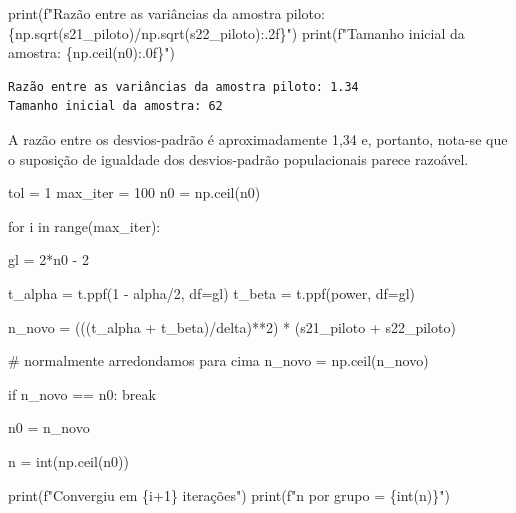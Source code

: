 \documentclass[
  letterpaper,
  DIV=11,
  numbers=noendperiod]{scrreprt}
\newenvironment{Shaded}{\begin{snugshade}}{\end{snugshade}}
\newcommand{\BuiltInTok}[1]{\textcolor[rgb]{0.00,0.23,0.31}{#1}}
\newcommand{\CommentTok}[1]{\textcolor[rgb]{0.37,0.37,0.37}{#1}}
\newcommand{\ControlFlowTok}[1]{\textcolor[rgb]{0.00,0.23,0.31}{#1}}
\newcommand{\DecValTok}[1]{\textcolor[rgb]{0.68,0.00,0.00}{#1}}
\newcommand{\KeywordTok}[1]{\textcolor[rgb]{0.00,0.23,0.31}{#1}}
\newcommand{\NormalTok}[1]{\textcolor[rgb]{0.00,0.23,0.31}{#1}}
\newcommand{\OperatorTok}[1]{\textcolor[rgb]{0.37,0.37,0.37}{#1}}
\newcommand{\SpecialCharTok}[1]{\textcolor[rgb]{0.37,0.37,0.37}{#1}}
\newcommand{\SpecialStringTok}[1]{\textcolor[rgb]{0.13,0.47,0.30}{#1}}
\begin{document}
\begin{Shaded}
\begin{Highlighting}[]
\BuiltInTok{print}\NormalTok{(}\SpecialStringTok{f"Razão entre as variâncias da amostra piloto: }\SpecialCharTok{\{}\NormalTok{np}\SpecialCharTok{.}\NormalTok{sqrt(s21\_piloto)}\OperatorTok{/}\NormalTok{np}\SpecialCharTok{.}\NormalTok{sqrt(s22\_piloto)}\SpecialCharTok{:.2f\}}\SpecialStringTok{"}\NormalTok{)}
\BuiltInTok{print}\NormalTok{(}\SpecialStringTok{f"Tamanho inicial da amostra: }\SpecialCharTok{\{}\NormalTok{np}\SpecialCharTok{.}\NormalTok{ceil(n0)}\SpecialCharTok{:.0f\}}\SpecialStringTok{"}\NormalTok{)}
\end{Highlighting}
\end{Shaded}

\begin{verbatim}
Razão entre as variâncias da amostra piloto: 1.34
Tamanho inicial da amostra: 62
\end{verbatim}

A razão entre os desvios-padrão é aproximadamente 1,34 e, portanto,
nota-se que o suposição de igualdade dos desvios-padrão populacionais
parece razoável.

\begin{Shaded}
\begin{Highlighting}[]
\NormalTok{tol }\OperatorTok{=} \DecValTok{1}
\NormalTok{max\_iter }\OperatorTok{=} \DecValTok{100}
\NormalTok{n0 }\OperatorTok{=}\NormalTok{ np.ceil(n0)}

\ControlFlowTok{for}\NormalTok{ i }\KeywordTok{in} \BuiltInTok{range}\NormalTok{(max\_iter):}

\NormalTok{    gl }\OperatorTok{=} \DecValTok{2}\OperatorTok{*}\NormalTok{n0 }\OperatorTok{{-}} \DecValTok{2}

\NormalTok{    t\_alpha }\OperatorTok{=}\NormalTok{ t.ppf(}\DecValTok{1} \OperatorTok{{-}}\NormalTok{ alpha}\OperatorTok{/}\DecValTok{2}\NormalTok{, df}\OperatorTok{=}\NormalTok{gl)}
\NormalTok{    t\_beta }\OperatorTok{=}\NormalTok{ t.ppf(power, df}\OperatorTok{=}\NormalTok{gl)}

\NormalTok{    n\_novo }\OperatorTok{=}\NormalTok{ (((t\_alpha }\OperatorTok{+}\NormalTok{ t\_beta)}\OperatorTok{/}\NormalTok{delta)}\OperatorTok{**}\DecValTok{2}\NormalTok{) }\OperatorTok{*}\NormalTok{ (s21\_piloto }\OperatorTok{+}\NormalTok{ s22\_piloto)}

    \CommentTok{\# normalmente arredondamos para cima}
\NormalTok{    n\_novo }\OperatorTok{=}\NormalTok{ np.ceil(n\_novo)}

    \ControlFlowTok{if}\NormalTok{ n\_novo }\OperatorTok{==}\NormalTok{ n0:}
        \ControlFlowTok{break}

\NormalTok{    n0 }\OperatorTok{=}\NormalTok{ n\_novo}

\NormalTok{n }\OperatorTok{=} \BuiltInTok{int}\NormalTok{(np.ceil(n0)) }

\BuiltInTok{print}\NormalTok{(}\SpecialStringTok{f"Convergiu em }\SpecialCharTok{\{}\NormalTok{i}\OperatorTok{+}\DecValTok{1}\SpecialCharTok{\}}\SpecialStringTok{ iterações"}\NormalTok{)}
\BuiltInTok{print}\NormalTok{(}\SpecialStringTok{f"n por grupo = }\SpecialCharTok{\{}\BuiltInTok{int}\NormalTok{(n)}\SpecialCharTok{\}}\SpecialStringTok{"}\NormalTok{)}
\end{Highlighting}
\end{Shaded}
\end{document}

